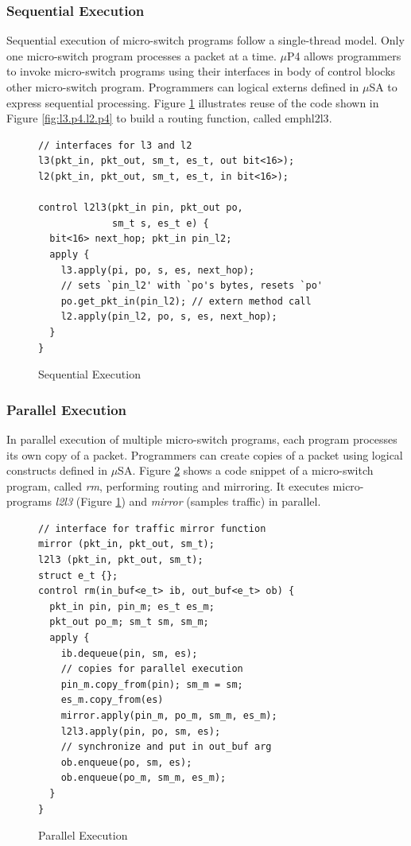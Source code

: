 \subsubsection{Sequential Execution}
\label{subsubsection:sequential-execution}
Sequential execution of micro-switch programs follow a single-thread model.
Only one micro-switch program processes a packet at a time.
$\mu$P4 allows programmers to invoke micro-switch programs using their interfaces in body of control blocks other micro-switch program.
Programmers can logical externs defined in $\mu$SA to express sequential processing.
Figure \ref{fig:sequential-execution} illustrates reuse of the code shown in Figure \ref{fig:l3.p4.l2.p4} to build a routing function, called emph{l2l3}.
 \begin{figure}[ht]
\begin{lstlisting}[frame=none]
// interfaces for l3 and l2
l3(pkt_in, pkt_out, sm_t, es_t, out bit<16>);
l2(pkt_in, pkt_out, sm_t, es_t, in bit<16>);

control l2l3(pkt_in pin, pkt_out po, 
             sm_t s, es_t e) {
  bit<16> next_hop; pkt_in pin_l2;
  apply {
    l3.apply(pi, po, s, es, next_hop);
    // sets `pin_l2' with `po's bytes, resets `po'
    po.get_pkt_in(pin_l2); // extern method call
    l2.apply(pin_l2, po, s, es, next_hop);
  }
}
\end{lstlisting}
\caption{Sequential Execution}
\label{fig:sequential-execution}
\end{figure}

\subsubsection{Parallel Execution}
\label{subsubsection:parallel-execution}
In parallel execution of multiple micro-switch programs, each program processes its own copy of a packet.
Programmers can create copies of a packet using logical constructs defined in $\mu$SA.
Figure \ref{fig:parallel-execution} shows a code snippet of a micro-switch program, called \emph{rm}, performing routing and mirroring.
It executes micro-programs \emph{l2l3} (Figure \ref{fig:sequential-execution}) and \emph{mirror} (samples traffic) in parallel.
\begin{figure}[ht]
\begin{lstlisting}[frame=none]
// interface for traffic mirror function
mirror (pkt_in, pkt_out, sm_t);
l2l3 (pkt_in, pkt_out, sm_t);
struct e_t {};
control rm(in_buf<e_t> ib, out_buf<e_t> ob) {
  pkt_in pin, pin_m; es_t es_m;
  pkt_out po_m; sm_t sm, sm_m;
  apply {
    ib.dequeue(pin, sm, es);
    // copies for parallel execution
    pin_m.copy_from(pin); sm_m = sm; 
    es_m.copy_from(es)
    mirror.apply(pin_m, po_m, sm_m, es_m);
    l2l3.apply(pin, po, sm, es);
    // synchronize and put in out_buf arg
    ob.enqueue(po, sm, es);
    ob.enqueue(po_m, sm_m, es_m);
  }
}
\end{lstlisting}
\caption{Parallel Execution}
\label{fig:parallel-execution}
\end{figure}

